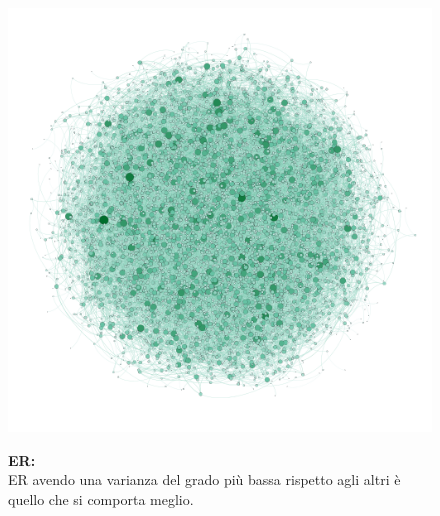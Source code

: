 \documentclass{article}
\begin{document}
\begin{figure}[H]
	\begin{minipage}{0.5\linewidth}
		\centering
		\includegraphics[width=0.9\linewidth, valign=t]{figures/ER}
	\end{minipage}
	\begin{minipage}{0.55\linewidth}
		\textbf{ER:}\\
		ER avendo una varianza del grado più bassa rispetto agli altri è quello che si comporta meglio.\\
	\end{minipage}
\end{figure}
\end{document}
